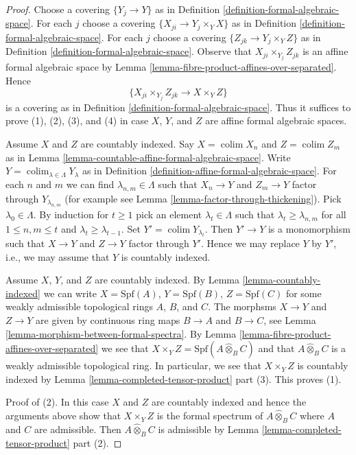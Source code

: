 \documentclass{stacks-project}
\theoremstyle{plain}
\theoremstyle{definition}
\theoremstyle{remark}
\numberwithin{equation}{subsection}
\def\colim{\mathop{\mathrm{colim}}\nolimits}
\begin{document}
\begin{proof}
Choose a covering $\{Y_j \to Y\}$ as in
Definition \ref{definition-formal-algebraic-space}.
For each $j$ choose a covering $\{X_{ji} \to Y_j \times_Y X\}$
as in Definition \ref{definition-formal-algebraic-space}.
For each $j$ choose a covering $\{Z_{jk} \to Y_j \times_Y Z\}$
as in Definition \ref{definition-formal-algebraic-space}.
Observe that $X_{ji} \times_{Y_j} Z_{jk}$ is an
affine formal algebraic space by
Lemma \ref{lemma-fibre-product-affines-over-separated}.
Hence
$$
\{X_{ji} \times_{Y_j} Z_{jk} \to X \times_Y Z\}
$$
is a covering as in Definition \ref{definition-formal-algebraic-space}.
Thus it suffices to prove (1), (2), (3), and (4) in case $X$, $Y$, and $Z$
are affine formal algebraic spaces.

\medskip\noindent
Assume $X$ and $Z$ are countably indexed. Say $X = \colim X_n$ and
$Z = \colim Z_m$ as in
Lemma \ref{lemma-countable-affine-formal-algebraic-space}.
Write $Y = \colim_{\lambda \in \Lambda} Y_\lambda$ as in
Definition \ref{definition-affine-formal-algebraic-space}.
For each $n$ and $m$ we can find $\lambda_{n, m} \in \Lambda$
such that $X_n \to Y$ and $Z_m \to Y$ factor through $Y_{\lambda_{n, m}}$
(for example see Lemma \ref{lemma-factor-through-thickening}).
Pick $\lambda_0 \in \Lambda$. By induction for $t \geq 1$
pick an element $\lambda_t \in \Lambda$ such that
$\lambda_t \geq \lambda_{n, m}$ for all $1 \leq n, m \leq t$
and $\lambda_t \geq \lambda_{t - 1}$. Set $Y' = \colim Y_{\lambda_t}$.
Then $Y' \to Y$ is a monomorphism such that $X \to Y$ and $Z \to Y$
factor through $Y'$. Hence we may replace $Y$ by $Y'$, i.e.,
we may assume that $Y$ is countably indexed.

\medskip\noindent
Assume $X$, $Y$, and $Z$ are countably indexed. By
Lemma \ref{lemma-countably-indexed} we can write
$X = \text{Spf}(A)$, $Y = \text{Spf}(B)$, $Z = \text{Spf}(C)$
for some weakly admissible topological rings $A$, $B$, and $C$.
The morphsms $X \to Y$ and $Z \to Y$ are given by
continuous ring maps $B \to A$ and $B \to C$, see
Lemma \ref{lemma-morphism-between-formal-spectra}.
By Lemma \ref{lemma-fibre-product-affines-over-separated}
we see that $X \times_Y Z = \text{Spf}(A \widehat{\otimes}_B C)$
and that $A \widehat{\otimes}_B C$ is a weakly admissible topological ring.
In particular, we see that $X \times_Y Z$ is countably indexed
by Lemma \ref{lemma-completed-tensor-product} part (3).
This proves (1).

\medskip\noindent
Proof of (2). In this case $X$ and $Z$ are countably indexed and
hence the arguments above show that $X \times_Y Z$ is the formal spectrum
of $A \widehat{\otimes}_B C$ where $A$ and $C$ are admissible.
Then $A \widehat{\otimes}_B C$ is admissible by 
Lemma \ref{lemma-completed-tensor-product} part (2).


\end{proof}
\end{document}
